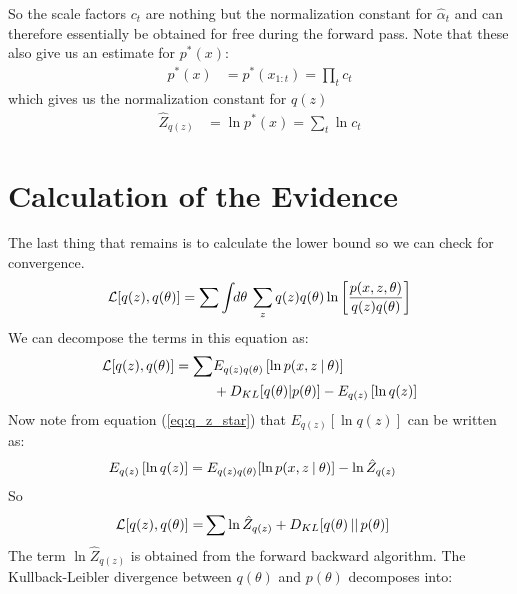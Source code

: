 So the scale factors $c_t$ are nothing but the normalization constant for $\hat{\alpha}_t$ and can therefore essentially be obtained for free during the forward pass. Note that these also give us an estimate for $p^*(x)$:
\begin{align}
   p^*(x) &= p^*(x_{1:t}) = \prod_t c_t
\end{align}
which gives us the normalization constant for $q(z)$
\begin{align}
   \hat{Z}_{q(z)} &= \ln p^*(x) = \sum_t \ln c_t
\end{align}


\section{Calculation of the Evidence}

The last thing that remains is to calculate the lower bound so we can check for convergence.
\begin{align}
  \begin{split}
  \mathcal{L}[q(z), q(\theta)]
    &=
    \sum 
    \int \!\!d\theta  \:
    \sum_{z }  
    q(z ) q(\theta )
    \ln
    \left[
      \frac{p(x , z , \theta )}
            {q(z ) q(\theta )}  
    \right] \\  
  \end{split}
\end{align}
We can decompose the terms in this equation as:
\begin{align}
  \begin{split}
  \mathcal{L}[q(z), q(\theta)]
    =
    \sum &
    E_{q(z )q(\theta )}
    \left[
      \ln p(x , z  \:|\: \theta )
    \right] \\
    & + 
    D_{KL}[q(\theta ) | p(\theta )]
    -
    E_{q(z )}
    \left[
      \ln q(z )
    \right]  
  \end{split}
\end{align}
Now note from equation (\ref{eq:q_z_star}) that $E_{q(z )} \left[ \ln q(z ) \right]$ can   
be written as:
\begin{align}
  E_{q(z )} \left[ \ln q(z ) \right]
  &=
  E_{q(z )q(\theta )}[\ln p(x , z  \:|\: \theta )] - \ln \hat{Z}_{q(z )}
\end{align}
So
\begin{align}
  \begin{split}
  \mathcal{L}[q(z), q(\theta)]
    = &
    \sum 
    \ln \hat{Z}_{q(z )} + D_{KL}[q(\theta ) \,||\, p(\theta )]
  \end{split}
\end{align}
The term $\ln \hat{Z}_{q(z )}$ is obtained from the forward backward algorithm. The Kullback-Leibler divergence between $q(\theta)$ and $p(\theta)$ decomposes into: 
